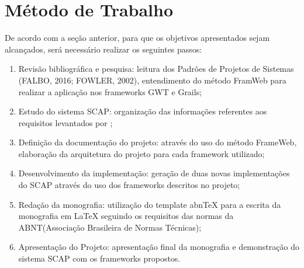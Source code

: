 
\section{Método de Trabalho}
\label{sec-metodo}


	
	

De acordo com a seção anterior, para que os objetivos apresentados sejam alcançados, será necessário realizar os seguintes passos:

\begin{enumerate}

    \item Revisão bibliográfica e pesquisa: leitura dos Padrões de Projetos de Sistemas (FALBO, 2016; FOWLER, 2002), entendimento do método FramWeb \cite{souza:masterthesis07} para realizar a aplicação nos frameworks GWT e Grails;
    \item Estudo do sistema SCAP: organização das informações referentes aos requisitos levantados por ;
    \item Definição da documentação do projeto: através do uso do método FrameWeb, elaboração da arquitetura do projeto para cada framework utilizado;
    \item Desenvolvimento da implementação: geração de duas novas implementações do SCAP através do uso dos frameworks descritos no projeto; 
    \item Redação da monografia: utilização do template abnTeX para a escrita da monografia em LaTeX seguindo os requisitos das normas da ABNT(Associação Brasileira de Normas Técnicas);
    \item Apresentação do Projeto: apresentação final da monografia e demonstração do sistema SCAP com os frameworks propostos.

\end{enumerate}    
    